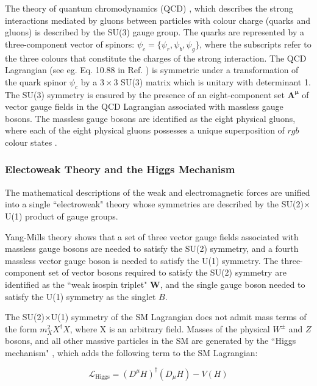 The theory of quantum chromodynamics (QCD) \cite{qcd_2007}, which describes the strong interactions mediated by gluons between particles with colour charge (quarks and gluons) is described by the SU(3) gauge group. The quarks are represented by a three-component vector of spinors: \(\psi_c = \{\psi_r, \psi_b, \psi_g\}\), where the subscripts refer to the three colours that constitute the charges of the strong interaction. The QCD Lagrangian (see eg. Eq. 10.88 in Ref. \cite{Griffiths_2008}) is symmetric under a transformation of the quark spinor \(\psi_c\) by a \(3\times3\) SU(3) matrix which is unitary with determinant 1. The SU(3) symmetry is ensured by the presence of an eight-component set \(\boldsymbol{\boldsymbol{A}^\mu}\) of vector gauge fields in the QCD Lagrangian associated with massless gauge bosons. The massless gauge bosons are identified as the eight physical gluons, where each of the eight physical gluons possesses a unique superposition of \({rgb}\) colour states \cite{Griffiths_2008}.

\subsubsection{Electoweak Theory and the Higgs Mechanism}

The mathematical descriptions of the weak and electromagnetic forces are unified into a single ``electroweak" \cite{electroweak_2012} theory whose symmetries are described by the SU(2)\(\times\)U(1) product of gauge groups. 

Yang-Mills theory \cite{yang_mills_1954} shows that a set of three vector gauge fields associated with massless gauge bosons are needed to satisfy the SU(2) symmetry, and a fourth massless vector gauge boson is needed to satisfy the U(1) symmetry. The three-component set of vector bosons required to satisfy the SU(2) symmetry are identified as the ``weak isospin triplet" \(\boldsymbol{W}\), and the single gauge boson needed to satisfy the U(1) symmetry as the singlet \(B\). 

The SU(2)\(\times\)U(1) symmetry of the SM Lagrangian does not admit mass terms of the form \(m_X^2X^\dagger X\), where X is an arbitrary field. Masses of the physical \(W^\pm\) and \(Z\) bosons, and all other massive particles in the SM are generated by the ``Higgs mechanism" \cite{HiggsTheory1,HiggsTheory2,HiggsTheory3}, which adds the following term to the SM Lagrangian:

\begin{equation}
\label{eq:higgs_lagrangian}
\mathcal{L}_\text{Higgs} = (D^\mu H)^\dagger(D_\mu H) - V(H)
\end{equation}

